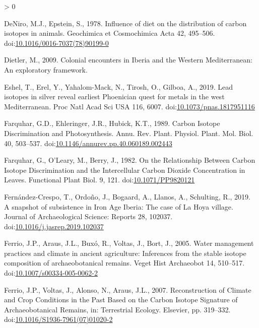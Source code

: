 \documentclass[5p]{elsarticle} %
\newlength{\cslhangindent}
\newenvironment{CSLReferences}[2] %
 {%
  \setlength{\parindent}{0pt}
  \ifodd #1 \everypar{\setlength{\hangindent}{\cslhangindent}}\ignorespaces\fi
  \ifnum #2 > 0
  \setlength{\parskip}{#2\baselineskip}
  \fi
 }%
 {}
\begin{document}
\begin{CSLReferences}{1}{0}
\leavevmode\hypertarget{ref-deniro_epstein78}{}%
DeNiro, M.J., Epstein, S., 1978. Influence of diet on the distribution of carbon isotopes in animals. Geochimica et Cosmochimica Acta 42, 495--506. doi:\href{https://doi.org/10.1016/0016-7037(78)90199-0}{10.1016/0016-7037(78)90199-0}

\leavevmode\hypertarget{ref-dietler09}{}%
Dietler, M., 2009. Colonial encounters in {Iberia} and the {Western Mediterranean}: {An} exploratory framework.

\leavevmode\hypertarget{ref-eshel_etal19}{}%
Eshel, T., Erel, Y., Yahalom-Mack, N., Tirosh, O., Gilboa, A., 2019. Lead isotopes in silver reveal earliest {Phoenician} quest for metals in the west {Mediterranean}. Proc Natl Acad Sci USA 116, 6007. doi:\href{https://doi.org/10.1073/pnas.1817951116}{10.1073/pnas.1817951116}

\leavevmode\hypertarget{ref-farquhar_etal89}{}%
Farquhar, G.D., Ehleringer, J.R., Hubick, K.T., 1989. Carbon {Isotope Discrimination} and {Photosynthesis}. Annu. Rev. Plant. Physiol. Plant. Mol. Biol. 40, 503--537. doi:\href{https://doi.org/10.1146/annurev.pp.40.060189.002443}{10.1146/annurev.pp.40.060189.002443}

\leavevmode\hypertarget{ref-farquhar_etal82}{}%
Farquhar, G., O'Leary, M., Berry, J., 1982. On the {Relationship Between Carbon Isotope Discrimination} and the {Intercellular Carbon Dioxide Concentration} in {Leaves}. Functional Plant Biol. 9, 121. doi:\href{https://doi.org/10.1071/PP9820121}{10.1071/PP9820121}

\leavevmode\hypertarget{ref-fernandez-crespo_etal19}{}%
Fernández-Crespo, T., Ordoño, J., Bogaard, A., Llanos, A., Schulting, R., 2019. A snapshot of subsistence in {Iron Age Iberia}: {The} case of {La Hoya} village. Journal of Archaeological Science: Reports 28, 102037. doi:\href{https://doi.org/10.1016/j.jasrep.2019.102037}{10.1016/j.jasrep.2019.102037}

\leavevmode\hypertarget{ref-ferrio_etal05}{}%
Ferrio, J.P., Araus, J.L., Buxó, R., Voltas, J., Bort, J., 2005. Water management practices and climate in ancient agriculture: Inferences from the stable isotope composition of archaeobotanical remains. Veget Hist Archaeobot 14, 510--517. doi:\href{https://doi.org/10.1007/s00334-005-0062-2}{10.1007/s00334-005-0062-2}

\leavevmode\hypertarget{ref-ferrio_etal07}{}%
Ferrio, J.P., Voltas, J., Alonso, N., Araus, J.L., 2007. Reconstruction of {Climate} and {Crop Conditions} in the {Past Based} on the {Carbon Isotope Signature} of {Archaeobotanical Remains}, in: Terrestrial {Ecology}. {Elsevier}, pp. 319--332. doi:\href{https://doi.org/10.1016/S1936-7961(07)01020-2}{10.1016/S1936-7961(07)01020-2}


\end{CSLReferences}
\end{document}

